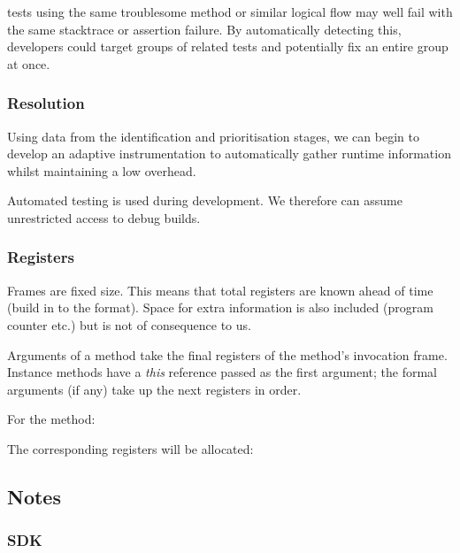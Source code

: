 \flaky{} tests using the same troublesome method or similar logical flow may well fail with the same stacktrace or assertion failure. By automatically detecting this, developers could target groups of related tests and potentially fix an entire group at once.


\subsubsection{Resolution}

Using data from the identification and prioritisation stages, we can begin to develop an adaptive instrumentation to automatically gather runtime information whilst maintaining a low overhead.


Automated testing is used during development. We therefore can assume unrestricted access to debug builds.

\subsubsection{Registers}
Frames are fixed size. This means that total registers are known ahead of time (build in to the format). Space for extra information is also included (program counter etc.) but is not of consequence to us.

Arguments of a method take the final registers of the method's invocation frame. Instance methods have a \textit{this} reference passed as the first argument; the formal arguments (if any) take up the next registers in order.

For the method:


The corresponding registers will be allocated:



\subsection{Notes}

\subsubsection{SDK}


